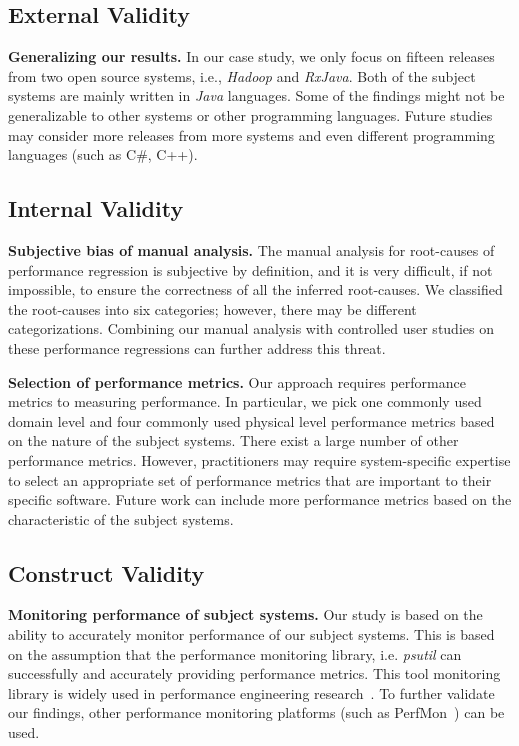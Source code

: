 \subsection{External Validity}

\textbf{Generalizing our results. }In our case study, we only focus on fifteen releases from two open source systems, i.e., \emph{Hadoop} and \emph{RxJava}. Both of the subject systems are mainly written in \emph{Java} languages. Some of the findings might not be generalizable to other systems or other programming languages. Future studies may consider more releases from more systems and even different programming languages (such as C\#, C++). 

\subsection{Internal Validity}

\textbf{Subjective bias of manual analysis.} The manual analysis for root-causes of performance regression is subjective by definition, and it is very difficult, if not impossible, to ensure the correctness of all the inferred
root-causes. We classified the root-causes into six categories; however, there may be different categorizations. Combining our manual analysis with controlled user studies on these performance regressions can further address this threat.

\textbf{Selection of performance metrics.} Our approach requires performance metrics to measuring performance. In particular, we pick one commonly used domain level and four commonly used physical level performance metrics based on the nature of the subject systems. There exist a large number of other performance metrics. However, practitioners may require system-specific expertise to select an appropriate set of performance metrics that are important to their specific software. Future work can include more performance metrics based on the characteristic of the subject systems. 

\subsection{Construct Validity}

\textbf{Monitoring performance of subject systems.} Our study is based on the ability to accurately monitor performance of our subject systems. This is based on the assumption that the performance monitoring library, i.e. \emph{psutil} can successfully and accurately providing performance metrics. This tool monitoring library is widely used in performance engineering research~\cite{peterfse,tarekmsr16}. To further validate our findings, other performance monitoring platforms (such as PerfMon~\cite{perfmon}) can be used. 

